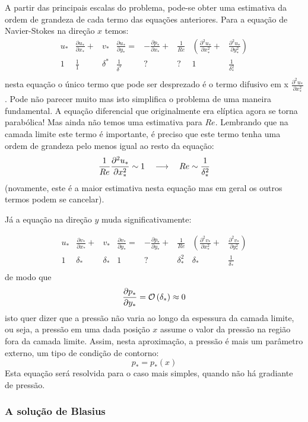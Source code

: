 A partir das principais escalas do problema, pode-se obter uma estimativa da ordem de grandeza de cada termo das equações anteriores. Para a equação de Navier-Stokes na direção $x$ temos:
\[
\begin{matrix}
 u_*&\frac{\partial u_*}{\partial x_*} + &v_*&\frac{\partial u_*}{\partial y_*} =& 
-\frac{\partial p_*}{\partial x_*} + &\frac{1}{Re} &\left( \frac{\partial^2 u_*}{\partial x_*^2}\right. +& \left.\frac{\partial^2 u_*}{\partial y_*^2}\right) \\
1 & \frac{1}{1} & \delta^* & \frac{1}{\delta^*} & ? & ? & 1 & \frac{1}{\delta_*^2} \\
\end{matrix}
\]
nesta equação o único termo que pode ser desprezado é o termo difusivo em x $\frac{\partial^2 u_*}{\partial x_*^2}$. Pode não parecer muito mas isto simplifica o problema de uma maneira fundamental. A equação diferencial que originalmente era elíptica agora se torna parabólica! Mas ainda não temos uma estimativa para $Re$. Lembrando que na camada limite este termo é importante, é preciso que este termo tenha uma ordem de grandeza pelo menos igual ao resto da equação:
\[
\frac{1}{Re} \frac{\partial^2 u_*}{\partial x_*^2} \sim 1 \quad\longrightarrow\quad Re \sim \frac{1}{\delta_*^2}
\]
(novamente, este é a maior estimativa nesta equação mas em geral os outros termos podem se cancelar).

Já a equação na direção $y$ muda significativamente:

\[
\begin{matrix}
u_*&\frac{\partial v_*}{\partial x_*} + &v_*&\frac{\partial v_*}{\partial y_*} =& 
-\frac{\partial p_*}{\partial y_*} + &\frac{1}{Re} &\left( \frac{\partial^2 v_*}{\partial x_*^2}\right. +& \left.\frac{\partial^2 v_*}{\partial y_*^2}\right) \\
 1 & \delta_* & \delta_* & 1 & ? & \delta_*^2 & \delta_* & \frac{1}{\delta_*} \\
\end{matrix}
\]
de modo que 
\[
\frac{\partial p_*}{\partial y_*} = \mathcal{O}\left(\delta_*\right) \approx 0
\]
isto quer dizer que a pressão não varia ao longo da espessura da camada limite, ou seja, a pressão em uma dada posição $x$ assume o valor da pressão na região fora da camada limite. Assim, nesta aproximação, a pressão é mais um parâmetro externo, um tipo de condição de contorno:
\[
p_* = p_*(x)
\]
Esta equação será resolvida para o caso mais simples, quando não há gradiante de pressão.

\subsubsection{A solução de Blasius}

